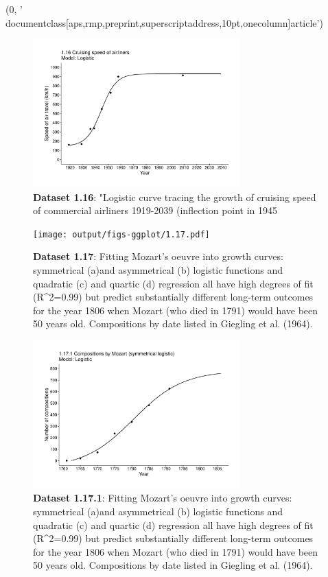 (0, '\\documentclass[aps,rmp,preprint,superscriptaddress,10pt,onecolumn]{article}\n')
\begin{document}
\begin{figure}[h]
\includegraphics[width=8cm]{output/figs-ggplot/1.16.pdf}
\caption{\textbf{Dataset 1.16}: "Logistic curve tracing the growth of cruising speed of commercial airliners 1919-2039 (inflection point in 1945}
\end{figure}
	
\begin{figure}[h]
\texttt{[image: output/figs-ggplot/1.17.pdf]}
\caption{\textbf{Dataset 1.17}: Fitting Mozart's oeuvre into growth curves: symmetrical (a)and asymmetrical (b) logistic functions and quadratic (c) and quartic (d) regression all have high degrees of fit (R^2=0.99) but predict substantially different long-term outcomes for the year 1806 when Mozart (who died in 1791) would have been 50 years old. Compositions by date listed in Giegling et al. (1964).}
\end{figure}
	
\begin{figure}[h]
\includegraphics[width=8cm]{output/figs-ggplot/1.17.1.pdf}
\caption{\textbf{Dataset 1.17.1}: Fitting Mozart's oeuvre into growth curves: symmetrical (a)and asymmetrical (b) logistic functions and quadratic (c) and quartic (d) regression all have high degrees of fit (R^2=0.99) but predict substantially different long-term outcomes for the year 1806 when Mozart (who died in 1791) would have been 50 years old. Compositions by date listed in Giegling et al. (1964).}
\end{figure}
	
\end{document}

